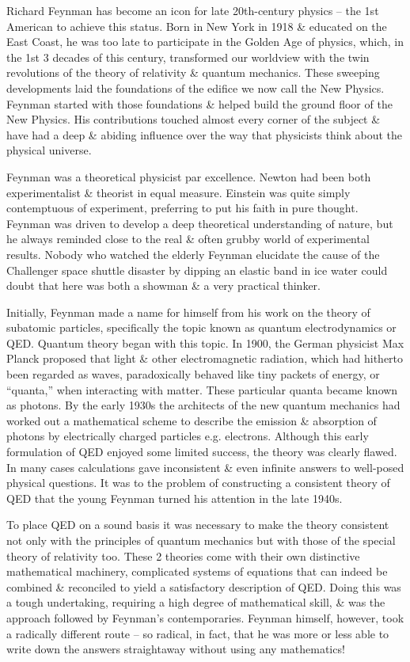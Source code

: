 \documentclass{article}
\begin{document}
{\sc Richard Feynman} has become an icon for late 20th-century physics -- the 1st American to achieve this status. Born in New York in 1918 \& educated on the East Coast, he was too late to participate in the Golden Age of physics, which, in the 1st 3 decades of this century, transformed our worldview with the twin revolutions of the theory of relativity \& quantum mechanics. These sweeping developments laid the foundations of the edifice we now call the New Physics. {\sc Feynman} started with those foundations \& helped build the ground floor of the New Physics. His contributions touched almost every corner of the subject \& have had a deep \& abiding influence over the way that physicists think about the physical universe.

{\sc Feynman} was a theoretical physicist par excellence. {\sc Newton} had been both experimentalist \& theorist in equal measure. {\sc Einstein} was quite simply contemptuous of experiment, preferring to put his faith in pure thought. {\sc Feynman} was driven to develop a deep theoretical understanding of nature, but he always reminded close to the real \& often grubby world of experimental results. Nobody who watched the elderly {\sc Feynman} elucidate the cause of the Challenger space shuttle disaster by dipping an elastic band in ice water could doubt that here was both a showman \& a very practical thinker.

Initially, {\sc Feynman} made a name for himself from his work on the theory of subatomic particles, specifically the topic known as quantum electrodynamics or QED. Quantum theory began with this topic. In 1900, the German physicist {\sc Max Planck} proposed that light \& other electromagnetic radiation, which had hitherto been regarded as waves, paradoxically behaved like tiny packets of energy, or ``quanta,'' when interacting with matter. These particular quanta became known as photons. By the early 1930s the architects of the new quantum mechanics had worked out a mathematical scheme to describe the emission \& absorption of photons by electrically charged particles e.g. electrons. Although this early formulation of QED enjoyed some limited success, the theory was clearly flawed. In many cases calculations gave inconsistent \& even infinite answers to well-posed physical questions. It was to the problem of constructing a consistent theory of QED that the young {\sc Feynman} turned his attention in the late 1940s.

To place QED on a sound basis it was necessary to make the theory consistent not only with the principles of quantum mechanics but with those of the special theory of relativity too. These 2 theories come with their own distinctive mathematical machinery, complicated systems of equations that can indeed be combined \& reconciled to yield a satisfactory description of QED. Doing this was a tough undertaking, requiring a high degree of mathematical skill, \& was the approach followed by {\sc Feynman}'s contemporaries. {\sc Feynman} himself, however, took a radically different route -- so radical, in fact, that he was more or less able to write down the answers straightaway without using any mathematics!
\end{document}
